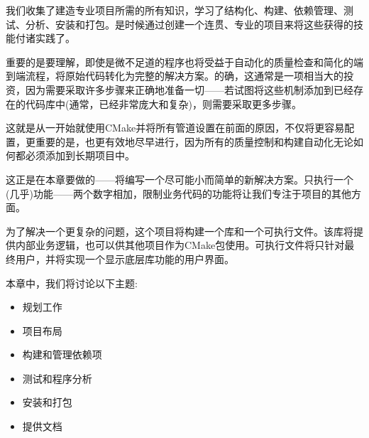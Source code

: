 
我们收集了建造专业项目所需的所有知识，学习了结构化、构建、依赖管理、测试、分析、安装和打包。是时候通过创建一个连贯、专业的项目来将这些获得的技能付诸实践了。

重要的是要理解，即使是微不足道的程序也将受益于自动化的质量检查和简化的端到端流程，将原始代码转化为完整的解决方案。的确，这通常是一项相当大的投资，因为需要采取许多步骤来正确地准备一切——若试图将这些机制添加到已经存在的代码库中(通常，已经非常庞大和复杂)，则需要采取更多步骤。

这就是从一开始就使用CMake并将所有管道设置在前面的原因，不仅将更容易配置，更重要的是，也更有效地尽早进行，因为所有的质量控制和构建自动化无论如何都必须添加到长期项目中。

这正是在本章要做的——将编写一个尽可能小而简单的新解决方案。只执行一个(几乎)功能——两个数字相加，限制业务代码的功能将让我们专注于项目的其他方面。

为了解决一个更复杂的问题，这个项目将构建一个库和一个可执行文件。该库将提供内部业务逻辑，也可以供其他项目作为CMake包使用。可执行文件将只针对最终用户，并将实现一个显示底层库功能的用户界面。

本章中，我们将讨论以下主题:

\begin{itemize}
\item 
规划工作

\item 
项目布局

\item 
构建和管理依赖项

\item 
测试和程序分析

\item 
安装和打包

\item 
提供文档
\end{itemize}
